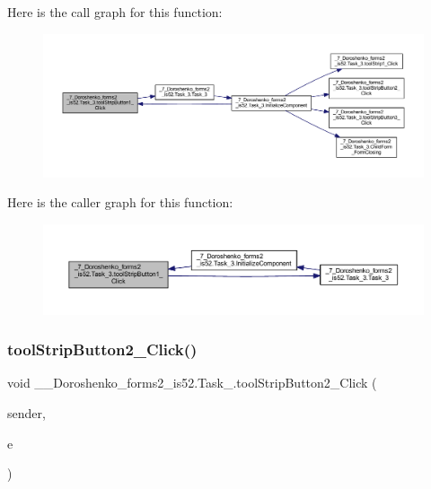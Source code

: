 Here is the call graph for this function\+:
\nopagebreak
\begin{figure}[H]
\begin{center}
\leavevmode
\includegraphics[width=350pt]{class__7___doroshenko__forms2__is52_1_1_task__3_aaecbab376c02299c5fa94fbc39072759_cgraph}
\end{center}
\end{figure}
Here is the caller graph for this function\+:
\nopagebreak
\begin{figure}[H]
\begin{center}
\leavevmode
\includegraphics[width=350pt]{class__7___doroshenko__forms2__is52_1_1_task__3_aaecbab376c02299c5fa94fbc39072759_icgraph}
\end{center}
\end{figure}
\hypertarget{class__7___doroshenko__forms2__is52_1_1_task__3_afe243424d82afcfa1257f933e7e0017c}{}\label{class__7___doroshenko__forms2__is52_1_1_task__3_afe243424d82afcfa1257f933e7e0017c} 
\subsubsection{\texorpdfstring{tool\+Strip\+Button2\+\_\+\+Click()}{toolStripButton2\_Click()}}
{\footnotesize\ttfamily void \+\_\+\_\+\+Doroshenko\+\_\+forms2\+\_\+is52.\+Task\+\_.\+tool\+Strip\+Button2\+\_\+\+Click (\begin{DoxyParamCaption}\item[{object}]{sender,  }\item[{Event\+Args}]{e }\end{DoxyParamCaption})\hspace{0.3cm}{\ttfamily [private]}}

